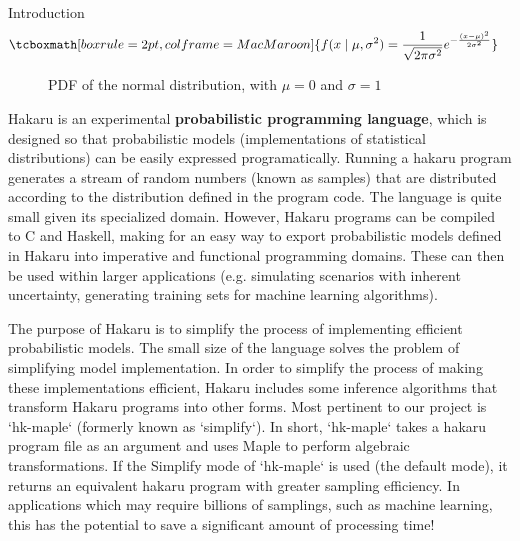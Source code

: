 \documentclass[22pt]{beamer}
\begin{document}
\begin{frame}[fragile]
\begin{textblock}{5}
\begin{block}{Introduction}
\begin{equation*}
\begin{aligned}
& \tcboxmath[boxrule=2pt,colframe=MacMaroon]{f(x \mid \mu, \sigma^2) = \frac{1}{\sqrt{2\pi\sigma^2}} e^{-\frac{(x - \mu)^2}{2\sigma^2}}}
\end{aligned}
\end{equation*}

\begin{figure}
\caption{\tiny{PDF of the normal distribution, with $\mu = 0$ and $\sigma = 1$}}
\end{figure}

\tiny{Hakaru is an experimental \textbf{probabilistic programming language}, which is designed so that probabilistic models (implementations of statistical distributions) can be easily expressed programatically. Running a hakaru program generates a stream of random numbers (known as samples) that are distributed according to the distribution defined in the program code. The language is quite small given its specialized domain. However, Hakaru programs can be compiled to C and Haskell, making for an easy way to export probabilistic models defined in Hakaru into imperative and functional programming domains. These can then be used within larger applications (e.g. simulating scenarios with inherent uncertainty, generating training sets for machine learning algorithms).}

\bigskip

\tiny{The purpose of Hakaru is to simplify the process of implementing efficient probabilistic models. The small size of the language solves the problem of simplifying model implementation. In order to simplify the process of making these implementations efficient, Hakaru includes some inference algorithms that transform Hakaru programs into other forms. Most pertinent to our project is `hk-maple` (formerly known as `simplify`). In short, `hk-maple` takes a hakaru program file as an argument and uses Maple to perform algebraic transformations. If the Simplify mode of `hk-maple` is used (the default mode), it returns an equivalent hakaru program with greater sampling efficiency. In applications which may require billions of samplings, such as machine learning, this has the potential to save a significant amount of processing time!}


\end{block}
\end{textblock}
\end{frame}
\end{document}
